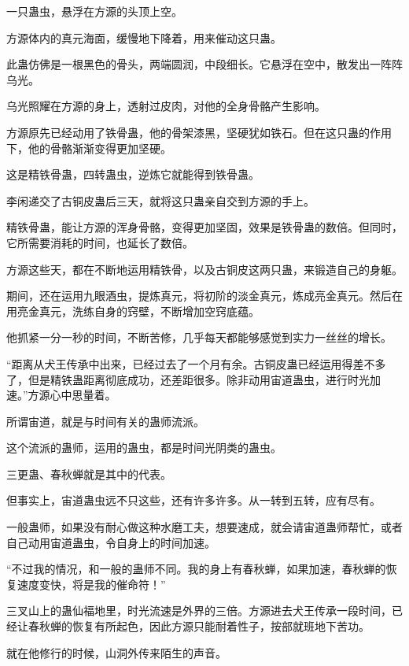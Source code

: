 
\begin{this_body}



一只蛊虫，悬浮在方源的头顶上空。

方源体内的真元海面，缓慢地下降着，用来催动这只蛊。

此蛊仿佛是一根黑色的骨头，两端圆润，中段细长。它悬浮在空中，散发出一阵阵乌光。

乌光照耀在方源的身上，透射过皮肉，对他的全身骨骼产生影响。

方源原先已经动用了铁骨蛊，他的骨架漆黑，坚硬犹如铁石。但在这只蛊的作用下，他的骨骼渐渐变得更加坚硬。

这是精铁骨蛊，四转蛊虫，逆炼它就能得到铁骨蛊。

李闲递交了古铜皮蛊后三天，就将这只蛊亲自交到方源的手上。

精铁骨蛊，能让方源的浑身骨骼，变得更加坚固，效果是铁骨蛊的数倍。但同时，它所需要消耗的时间，也延长了数倍。

方源这些天，都在不断地运用精铁骨，以及古铜皮这两只蛊，来锻造自己的身躯。

期间，还在运用九眼酒虫，提炼真元，将初阶的淡金真元，炼成亮金真元。然后在用亮金真元，洗练自身的窍壁，不断增加空窍底蕴。

他抓紧一分一秒的时间，不断苦修，几乎每天都能够感觉到实力一丝丝的增长。

“距离从犬王传承中出来，已经过去了一个月有余。古铜皮蛊已经运用得差不多了，但是精铁蛊距离彻底成功，还差距很多。除非动用宙道蛊虫，进行时光加速。”方源心中思量着。

所谓宙道，就是与时间有关的蛊师流派。

这个流派的蛊师，运用的蛊虫，都是时间光阴类的蛊虫。

三更蛊、春秋蝉就是其中的代表。

但事实上，宙道蛊虫远不只这些，还有许多许多。从一转到五转，应有尽有。

一般蛊师，如果没有耐心做这种水磨工夫，想要速成，就会请宙道蛊师帮忙，或者自己动用宙道蛊虫，令自身上的时间加速。

“不过我的情况，和一般的蛊师不同。我的身上有春秋蝉，如果加速，春秋蝉的恢复速度变快，将是我的催命符！”

三叉山上的蛊仙福地里，时光流速是外界的三倍。方源进去犬王传承一段时间，已经让春秋蝉的恢复有所起色，因此方源只能耐着性子，按部就班地下苦功。

就在他修行的时候，山洞外传来陌生的声音。


\end{this_body}
